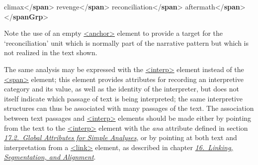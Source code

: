 \begin{shaded}
climax{</\textbf{span}>}\mbox{}\newline 
{}revenge{</\textbf{span}>}\mbox{}\newline 
{}reconciliation{</\textbf{span}>}\mbox{}\newline 
{}aftermath{</\textbf{span}>}\mbox{}\newline 
{</\textbf{spanGrp}>}\end{shaded}\egroup\par \par
Note the use of an empty \hyperref[TEI.anchor]{<anchor>} element to provide a target for the ‘reconciliation’ unit which is normally part of the narrative pattern but which is not realized in the text shown.\par
The same analysis may be expressed with the \hyperref[TEI.interp]{<interp>} element instead of the \hyperref[TEI.span]{<span>} element; this element provides attributes for recording an interpretive category and its value, as well as the identity of the interpreter, but does not itself indicate which passage of text is being interpreted; the same interpretive structures can thus be associated with many passages of the text. The association between text passages and \hyperref[TEI.interp]{<interp>} elements should be made either by pointing from the text to the \hyperref[TEI.interp]{<interp>} element with the {\itshape ana} attribute defined in section \textit{\hyperref[AIATTS]{17.2.\ Global Attributes for Simple Analyses}}, or by pointing at both text and interpretation from a \hyperref[TEI.link]{<link>} element,  as described in chapter \textit{\hyperref[SA]{16.\ Linking, Segmentation, and Alignment}}.\par
